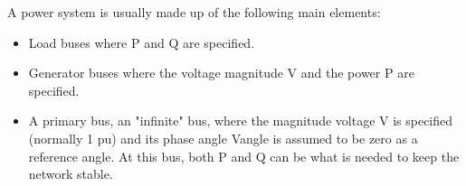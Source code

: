 \noindent A power system is usually made up of the following main elements:
\begin{itemize}
    \item Load buses where \gls{P} and \gls{Q} are specified.
    \item Generator buses where the voltage magnitude \gls{V} and the power \gls{P} are specified.
    \item A primary bus, an "infinite" bus, where the magnitude voltage \gls{V} is specified (normally 1 \gls{pu}) and its phase angle \gls{Vangle} is assumed to be zero as a reference angle. At this bus, both \gls{P} and \gls{Q} can be what is needed to keep the network stable. \cite{eps}
\end{itemize}

